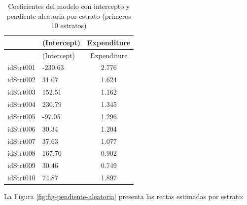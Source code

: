 \documentclass[
  spanish,
  12pt,
]{book}
\newenvironment{Shaded}{\begin{snugshade}}{\end{snugshade}}
\newcommand{\AttributeTok}[1]{\textcolor[rgb]{0.13,0.29,0.53}{#1}}
\newcommand{\FunctionTok}[1]{\textcolor[rgb]{0.13,0.29,0.53}{\textbf{#1}}}
\newcommand{\NormalTok}[1]{#1}
\newcommand{\OtherTok}[1]{\textcolor[rgb]{0.56,0.35,0.01}{#1}}
\newcommand{\SpecialCharTok}[1]{\textcolor[rgb]{0.81,0.36,0.00}{\textbf{#1}}}
\newcommand{\StringTok}[1]{\textcolor[rgb]{0.31,0.60,0.02}{#1}}
\begin{document}
\begin{longtable}[]{@{}llc@{}}
\caption{\label{tab:tab-coef-pendiente-aleatoria}Coeficientes del modelo con intercepto y pendiente aleatoria por estrato (primeros 10 estratos)}\tabularnewline
\toprule\noalign{}
& (Intercept) & Expenditure \\
\midrule\noalign{}
\endfirsthead
\toprule\noalign{}
& (Intercept) & Expenditure \\
\midrule\noalign{}
\endhead
\bottomrule\noalign{}
\endlastfoot
idStrt001 & -230.63 & 2.776 \\
idStrt002 & 31.07 & 1.624 \\
idStrt003 & 152.51 & 1.162 \\
idStrt004 & 230.79 & 1.345 \\
idStrt005 & -97.05 & 1.296 \\
idStrt006 & 30.34 & 1.204 \\
idStrt007 & 37.63 & 1.077 \\
idStrt008 & 167.70 & 0.902 \\
idStrt009 & 30.46 & 0.749 \\
idStrt010 & 74.87 & 1.897 \\
\end{longtable}

La Figura \ref{fig:fig-pendiente-aleatoria} presenta las rectas estimadas por estrato:

\begin{Shaded}
\end{Shaded}
\end{document}
